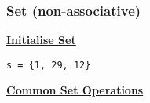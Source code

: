 \subsubsection{Set (non-associative)}
{\centering\underline{\textbf{Initialise Set}} \par}
\begin{lstlisting}
s = {1, 29, 12}
\end{lstlisting}

{\centering\underline{\textbf{Common Set Operations}} \par}
